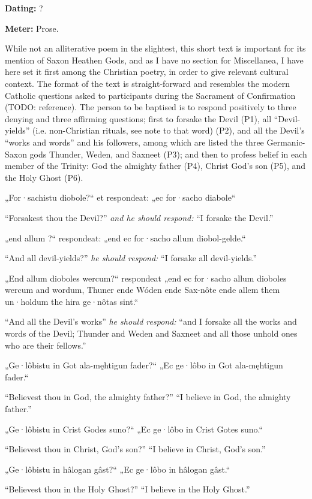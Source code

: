 
\begin{flushright}%
\textbf{Dating:} ?

\textbf{Meter:} Prose.
\end{flushright}%

While not an alliterative poem in the slightest, this short text is important for its mention of Saxon Heathen Gods, and as I have no section for Miscellanea, I have here set it first among the Christian poetry, in order to give relevant cultural context.  The format of the text is straight-forward and resembles the modern Catholic questions asked to participants during the Sacrament of Confirmation (TODO: reference).  The person to be baptised is to respond positively to three denying and three affirming questions; first to forsake the Devil (P1), all “Devil-yields” (i.e. non-Christian rituals, see note to that word) (P2), and all the Devil’s “works and words” and his followers, among which are listed the three Germanic-Saxon gods Thunder, Weden, and Saxneet (P3); and then to profess belief in each member of the Trinity: God the almighty father (P4), Christ God’s son (P5), and the Holy Ghost (P6).

\sectionline

\bpg
\bpa „For·sachistu diobole?“ et respondeat: „ec for·sacho diabole“\epa

\bpb “Forsakest thou the Devil?” \emph{and he should respond:} “I forsake the Devil.”\epb\epg


\bpg
\bpa „end allum ?“ respondeat: „end ec for·sacho allum diobol-gelde.“\epa

\bpb “And all devil-yields?” \emph{he should respond:} “I forsake all devil-yields.”\epb\epg


\bpg
\bpa „End allum dioboles wercum?“ respondeat „end ec for·sacho allum dioboles wercum and wordum, Thuner ende Wóden ende Sax-nôte ende allem them un·holdum the hira ge·nôtas sint.“\epa

\bpb “And all the Devil’s works” \emph{he should respond:} “and I forsake all the works and words of the Devil; Thunder and Weden and Saxneet and all those unhold ones who are their fellows.”\epb\epg


\bpg
\bpa „Ge·lôbistu in Got ala-męhtigun fader?“ „Ec ge·lôbo in Got ala-męhtigun fader.“\epa

\bpb “Believest thou in God, the almighty father?” “I believe in God, the almighty father.”\epb\epg


\bpg
\bpa „Ge·lôbistu in Crist Godes suno?“ „Ec ge·lôbo in Crist Gotes suno.“\epa

\bpb “Believest thou in Christ, God’s son?” “I believe in Christ, God’s son.”\epb\epg


\bpg
\bpa „Ge·lôbistu in hâlogan gâst?“ „Ec ge·lôbo in hâlogan gâst.“\epa

\bpb “Believest thou in the Holy Ghost?” “I believe in the Holy Ghost.”\epb\epg

\sectionline
